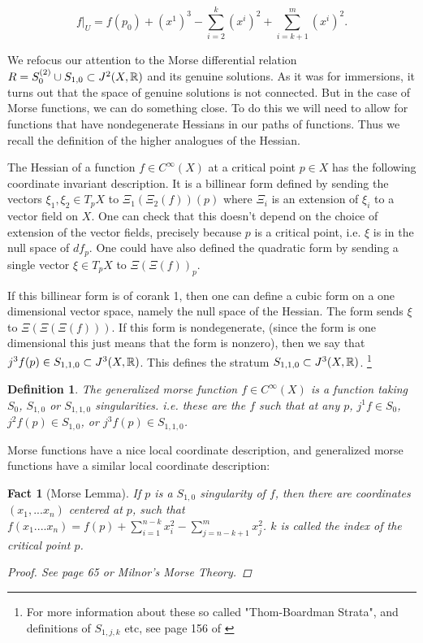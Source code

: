 \documentclass{article}
\newtheorem{fact}[theorem]{Fact}
\newtheorem{definition}[theorem]{Definition}
\newtheorem{proposed work}[theorem]{Proposed Work}
\theoremstyle{definition}
\begin{document}
$$f|_{U}=f(p_0)+(x^1)^3-\sum_{i=2}^{k}(x^i)^2+\sum_{i=k+1}^{m}(x^i)^2.$$


We refocus our attention to the Morse differential relation $R=S^{(2)}_0 \cup S_{1,0} \subset J^2(X,\mathbb R)$ and its genuine solutions.  As it was for immersions, it turns out that the space of genuine solutions is not connected.  But in the case of Morse functions, we can do something close.  To do this we will need to allow for functions that have nondegenerate Hessians in our paths of functions. Thus we recall the definition of the higher analogues of the Hessian.

The Hessian of a function $f \in C^\infty(X)$ at a critical point $p \in X$ has the following coordinate invariant description.  It is a billinear form defined by sending the vectors $\xi_1, \xi_2 \in T_pX$ to $\Xi_1(\Xi_2(f))(p)$ where $\Xi_i$ is an extension of $\xi_i$ to a vector field on $X$.  One can check that this doesn't depend on the choice of extension of the vector fields, precisely because $p$ is a critical point, i.e. $\xi$ is in the null space of $df_p$.  One could have also defined the quadratic form by sending a single vector $\xi \in T_pX$ to $\Xi(\Xi(f))_p$.

If this billinear form is of corank 1, then one can define a cubic form on a one dimensional vector space, namely the null space of the Hessian.  The form sends $\xi$ to $\Xi(\Xi(\Xi(f)))$.  If this form is nondegenerate, (since the form is one dimensional this just means that the form is nonzero), then we say that $j^3f(p) \in S_{1,1,0}\subset J^3(X,\mathbb R)$.  This defines the stratum $S_{1,1,0} \subset J^3(X,\mathbb R)$.   \footnote{ For more information about these so called "Thom-Boardman Strata", and definitions of $S_{1,j,k}$ etc, see page 156 of \cite{strata}}

\begin{definition}
The generalized morse function $f \in C^\infty(X)$ is a function taking $S_0$, $S_{1,0}$ or $S_{1,1,0}$ singularities.  i.e. these are the $f$ such that at any $p$, $j^1f \in S_0$, $j^2f(p) \in S_{1,0}$, or $j^3f(p) \in S_{1,1,0}$.
\end{definition}

Morse functions have a nice local coordinate description, and generalized morse functions have a similar local coordinate description:

\begin{fact}[Morse Lemma]

If $p$ is a $S_{1,0}$ singularity of $f$, then there are coordinates $(x_1,...x_n)$ centered at $p$, such that $f(x_1....x_n)=f(p)+ \sum_{i=1}^{n-k} x_i^2- \sum_{j=n-k+1}^m x_j^2$.  $k$ is called the index of the critical point $p$.

\begin{proof}
See \cite{strata} page 65 or Milnor's Morse Theory.
\end{proof}
\end{fact}
\end{document}
